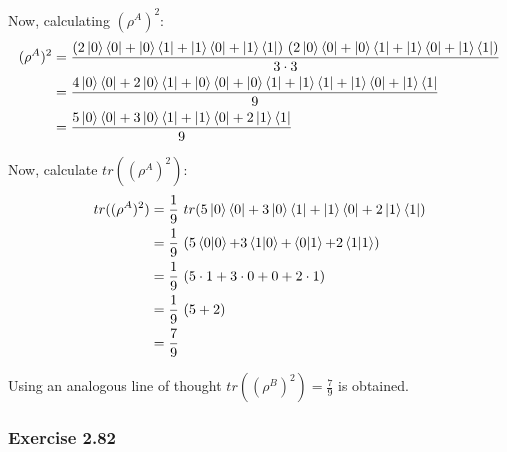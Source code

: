 Now, calculating $(\rho^A)^2$:
\begin{align}
    (\rho^A)^2 &= \frac{(2\ket{0}\bra{0} + \ket{0}\bra{1} +
        \ket{1}\bra{0} + \ket{1}\bra{1})\ (2\ket{0}\bra{0} + \ket{0}\bra{1} +
        \ket{1}\bra{0} + \ket{1}\bra{1})}{3 \cdot 3} \\
    &= \frac{4\ket{0}\bra{0} + 2\ket{0}\bra{1} + \ket{0}\bra{0} + \ket{0}\bra{1} +
        \ket{1}\bra{1} + \ket{1}\bra{0} + \ket{1}\bra{1}}{9} \\
    &= \frac{5\ket{0}\bra{0} + 3\ket{0}\bra{1} + \ket{1}\bra{0} + 2\ket{1}\bra{1}}{9}
\end{align}

Now, calculate $tr((\rho^A)^2)$:
\begin{align}
    tr((\rho^A)^2) &= \frac{1}{9}\ tr(5\ket{0}\bra{0} + 3\ket{0}\bra{1} +
        \ket{1}\bra{0} + 2\ket{1}\bra{1}) \\
    &= \frac{1}{9}\ (5\mathop{\mathinner{ \langle{0}|{0}\rangle}} + 3\mathop{\mathinner{ \langle{1}|{0}\rangle}} +
        \mathop{\mathinner{ \langle{0}|{1}\rangle}} + 2\mathop{\mathinner{ \langle{1}|{1}\rangle}}) \\
    &= \frac{1}{9}\ (5 \cdot 1 + 3 \cdot 0 + 0 + 2 \cdot 1) \\
    &= \frac{1}{9}\ (5 + 2) \\
    &= \frac{7}{9}
\end{align}

Using an analogous line of thought $tr((\rho^B)^2) = \frac{7}{9}$ is obtained.

\subsubsection{Exercise 2.82}

